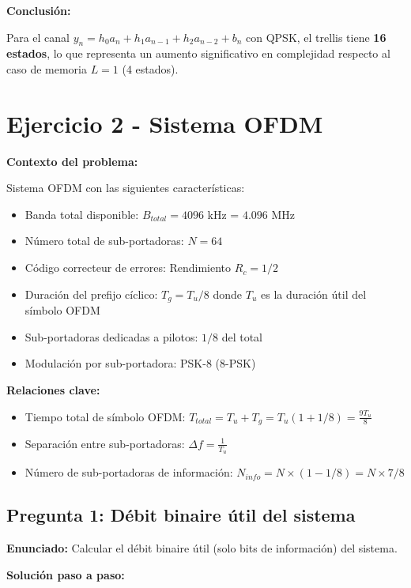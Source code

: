 \documentclass[11pt,a4paper]{article}
\begin{document}
\textbf{Conclusi\'on:}

Para el canal $y_n = h_0 a_n + h_1 a_{n-1} + h_2 a_{n-2} + b_n$ con QPSK, el trellis tiene \textbf{16 estados}, lo que representa un aumento significativo en complejidad respecto al caso de memoria $L=1$ (4 estados).

\newpage
\section*{Ejercicio 2 - Sistema OFDM}

\textbf{Contexto del problema:}

Sistema OFDM con las siguientes caracter\'isticas:
\begin{itemize}
    \item Banda total disponible: $B_{total} = 4096$ kHz = $4.096$ MHz
    \item N\'umero total de sub-portadoras: $N = 64$
    \item C\'odigo correcteur de errores: Rendimiento $R_c = 1/2$
    \item Duraci\'on del prefijo c\'iclico: $T_g = T_u/8$ donde $T_u$ es la duraci\'on \'util del s\'imbolo OFDM
    \item Sub-portadoras dedicadas a pilotos: $1/8$ del total
    \item Modulaci\'on por sub-portadora: PSK-8 (8-PSK)
\end{itemize}

\textbf{Relaciones clave:}
\begin{itemize}
    \item Tiempo total de s\'imbolo OFDM: $T_{total} = T_u + T_g = T_u(1 + 1/8) = \frac{9T_u}{8}$
    \item Separaci\'on entre sub-portadoras: $\Delta f = \frac{1}{T_u}$
    \item N\'umero de sub-portadoras de informaci\'on: $N_{info} = N \times (1 - 1/8) = N \times 7/8$
\end{itemize}

\subsection*{Pregunta 1: D\'ebit binaire \'util del sistema}

\textbf{Enunciado:} Calcular el d\'ebit binaire \'util (solo bits de informaci\'on) del sistema.

\vspace{0.3cm}
\textbf{Soluci\'on paso a paso:}
\end{document}
